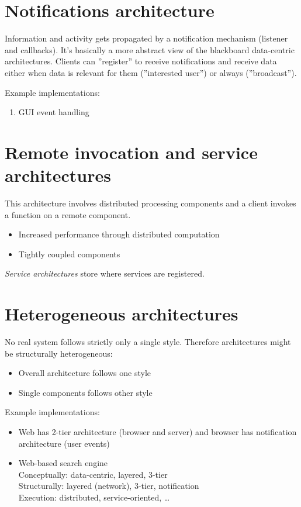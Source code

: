 \documentclass[a4paper]{report}
\begin{document}
\section{Notifications architecture}

Information and activity gets propagated by a notification mechanism
(listener and callbacks). It's basically a more abstract view of the
blackboard data-centric architectures. Clients can ''register'' to receive
notifications and receive data either when data is relevant for them
(''interested user'') or always (''broadcast'').

Example implementations:

\begin{enumerate}
  \item GUI event handling
\end{enumerate}

\section{Remote invocation and service architectures}

This architecture involves distributed processing components and a client
invokes a function on a remote component.

\begin{itemize}
  \item Increased performance through distributed computation
  \item Tightly coupled components
\end{itemize}

\emph{Service architectures} store where services are registered.

\section{Heterogeneous architectures}

No real system follows strictly only a single style. Therefore architectures
might be structurally heterogeneous:

\begin{itemize}
  \item Overall architecture follows one style
  \item Single components follows other style
\end{itemize}

Example implementations:

\begin{itemize}
  \item Web has 2-tier architecture (browser and server) and browser has
        notification architecture (user events)
  \item Web-based search engine \\
        Conceptually: data-centric, layered, 3-tier \\
        Structurally: layered (network), 3-tier, notification \\
        Execution: distributed, service-oriented, \dots
\end{itemize}
\end{document}
